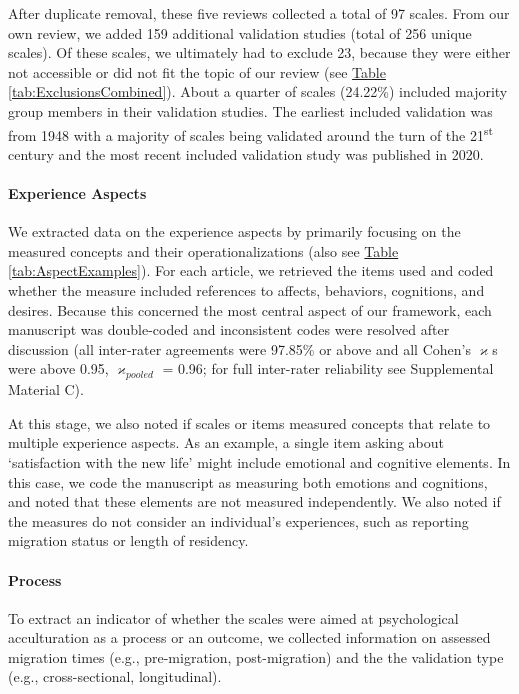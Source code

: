 \documentclass[man, 12pt, a4paper, mask]{apa7}
\newcommand{\tblref}[2][]{\hyperref[#2]{Table \ref*{#2}#1}}
\begin{document}
After duplicate removal, these five reviews collected a total of 97
scales. From our own review, we added 159 additional validation studies
(total of 256 unique scales). Of these scales, we ultimately had to
exclude 23, because they were either not accessible or did not fit the
topic of our review (see \tblref{tab:ExclusionsCombined}). About a
quarter of scales (24.22\%) included majority group members in their
validation studies. The earliest included validation was from 1948 with
a majority of scales being validated around the turn of the
21\textsuperscript{st} century and the most recent included validation
study was published in 2020.

\paragraph{Experience Aspects}

We extracted data on the experience aspects by primarily focusing on the
measured concepts and their operationalizations (also see
\tblref{tab:AspectExamples}). For each article, we retrieved the items
used and coded whether the measure included references to affects,
behaviors, cognitions, and desires. Because this concerned the most
central aspect of our framework, each manuscript was double-coded and
inconsistent codes were resolved after discussion (all inter-rater
agreements were 97.85\% or above and all Cohen's \(\varkappa\)s were
above 0.95, \(\varkappa_{pooled}\) = 0.96; for full inter-rater
reliability see Supplemental Material C).

At this stage, we also noted if scales or items measured concepts that
relate to multiple experience aspects. As an example, a single item
asking about `satisfaction with the new life' might include emotional
and cognitive elements. In this case, we code the manuscript as
measuring both emotions and cognitions, and noted that these elements
are not measured independently. We also noted if the measures do not
consider an individual's experiences, such as reporting migration status
or length of residency.

\paragraph{Process}

To extract an indicator of whether the scales were aimed at
psychological acculturation as a process or an outcome, we collected
information on assessed migration times (e.g., pre-migration,
post-migration) and the the validation type (e.g., cross-sectional,
longitudinal).
\end{document}
